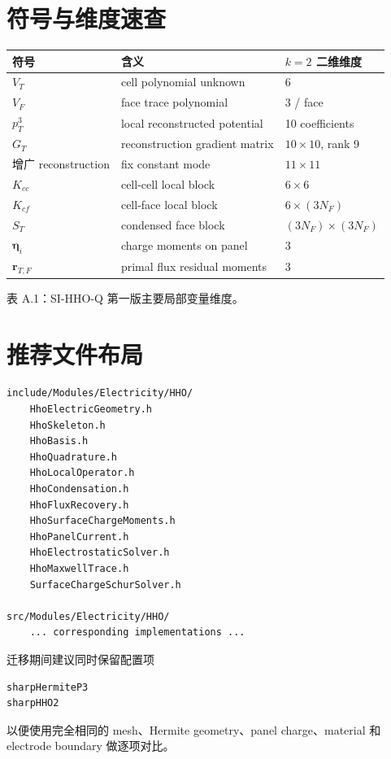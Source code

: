 \documentclass[UTF8,a4paper,11pt]{ctexart}
\newcommand{\vct}[1]{\bm{#1}}
\begin{document}
\appendix
\section{符号与维度速查}

\begin{center}
\begin{tabular}{lll}
\toprule
符号 & 含义 & \(k=2\) 二维维度\\
\midrule
\(V_T\) & cell polynomial unknown & 6\\
\(V_F\) & face trace polynomial & 3 / face\\
\(p_T^3\) & local reconstructed potential & 10 coefficients\\
\(G_T\) & reconstruction gradient matrix & \(10\times10\), rank 9\\
增广 reconstruction & fix constant mode & \(11\times11\)\\
\(K_{cc}\) & cell-cell local block & \(6\times6\)\\
\(K_{cf}\) & cell-face local block & \(6\times(3N_F)\)\\
\(S_T\) & condensed face block & \((3N_F)\times(3N_F)\)\\
\(\vct\eta_i\) & charge moments on panel & 3\\
\(\vct r_{T,F}\) & primal flux residual moments & 3\\
\bottomrule
\end{tabular}

\smallskip
{\small 表 A.1：SI-HHO-Q 第一版主要局部变量维度。}
\end{center}

\section{推荐文件布局}

\begin{lstlisting}
include/Modules/Electricity/HHO/
    HhoElectricGeometry.h
    HhoSkeleton.h
    HhoBasis.h
    HhoQuadrature.h
    HhoLocalOperator.h
    HhoCondensation.h
    HhoFluxRecovery.h
    HhoSurfaceChargeMoments.h
    HhoPanelCurrent.h
    HhoElectrostaticSolver.h
    HhoMaxwellTrace.h
    SurfaceChargeSchurSolver.h

src/Modules/Electricity/HHO/
    ... corresponding implementations ...
\end{lstlisting}

迁移期间建议同时保留配置项
\begin{lstlisting}
sharpHermiteP3
sharpHHO2
\end{lstlisting}
以便使用完全相同的 mesh、Hermite geometry、panel charge、material 和 electrode boundary 做逐项对比。
\end{document}
